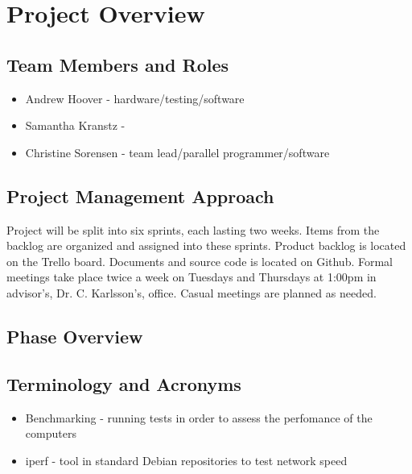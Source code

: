 

\chapter{Project Overview}



\section{Team Members and Roles}
\begin{itemize}
	\item Andrew Hoover - hardware/testing/software
	\item Samantha Kranstz - 
	\item Christine Sorensen - team lead/parallel programmer/software
\end{itemize}

\section{Project  Management Approach}
Project will be split into six sprints, each lasting two weeks. Items from the backlog are organized and assigned into these sprints. \newline \newline Product backlog is located on the Trello board. Documents and source code is located on Github. \newline \newline Formal meetings take place twice a week on Tuesdays and Thursdays at 1:00pm in advisor's, Dr. C. Karlsson's, office. Casual meetings are planned as needed.

\section{Phase  Overview}



\section{Terminology and Acronyms}
\begin{itemize}
	\item Benchmarking - running tests in order to assess the perfomance of the computers
	\item iperf - tool in standard Debian repositories to test network speed
\end{itemize}


